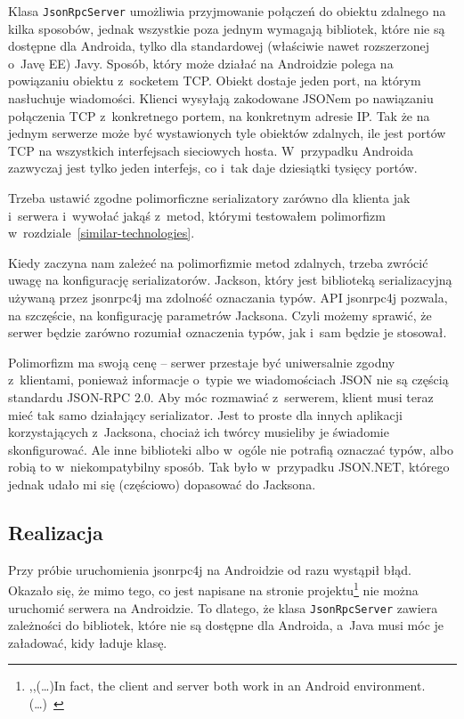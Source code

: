 Klasa \texttt{JsonRpcServer} umożliwia przyjmowanie połączeń do obiektu zdalnego na kilka sposobów, jednak wszystkie poza jednym wymagają bibliotek, które nie są dostępne dla Androida, tylko dla standardowej (właściwie nawet rozszerzonej o~Javę EE) Javy.
Sposób, który może działać na Androidzie polega na powiązaniu obiektu z~socketem TCP. Obiekt dostaje jeden port, na którym nasłuchuje wiadomości.
Klienci wysyłają zakodowane JSONem po nawiązaniu połączenia TCP z~konkretnego portem, na konkretnym adresie IP.
Tak że na jednym serwerze może być wystawionych tyle obiektów zdalnych, ile jest portów TCP na wszystkich interfejsach sieciowych hosta.
W~przypadku Androida zazwyczaj jest tylko jeden interfejs, co i~tak daje dziesiątki tysięcy portów.

Trzeba ustawić zgodne polimorficzne serializatory zarówno dla klienta jak i~serwera i~wywołać jakąś z~metod, którymi testowałem polimorfizm w~rozdziale~\ref{similar-technologies}.

Kiedy zaczyna nam zależeć na polimorfizmie metod zdalnych, trzeba zwrócić uwagę na konfigurację serializatorów.
Jackson, który jest biblioteką serializacyjną używaną przez jsonrpc4j ma zdolność oznaczania typów. API jsonrpc4j pozwala, na szczęście, na konfigurację parametrów Jacksona. Czyli możemy sprawić, że serwer będzie zarówno rozumiał oznaczenia typów, jak i~sam będzie je stosował.

Polimorfizm ma swoją cenę -- serwer przestaje być uniwersalnie zgodny z~klientami, ponieważ informacje o~typie we wiadomościach JSON nie są częścią standardu JSON-RPC 2.0.
Aby móc rozmawiać z~serwerem, klient musi teraz mieć tak samo działający serializator.
Jest to proste dla innych aplikacji korzystających z~Jacksona, chociaż ich twórcy musieliby je świadomie skonfigurować. Ale inne biblioteki albo w~ogóle nie potrafią oznaczać typów, albo robią to w~niekompatybilny sposób.
Tak było w~przypadku JSON.NET, którego jednak udało mi się (częściowo) dopasować do Jacksona. 


\subsection{Realizacja}
Przy próbie uruchomienia jsonrpc4j na Androidzie od razu wystąpił błąd. Okazało się, że mimo tego, co jest napisane na stronie projektu\footnote{,,(\ldots)In fact, the client and server both work in an Android environment.(\ldots)~\cite{jsonrpc4j}} nie można uruchomić serwera na Androidzie.
To dlatego, że klasa \texttt{JsonRpcServer} zawiera zależności do bibliotek, które nie są dostępne dla Androida, a~Java musi móc je załadować, kidy ładuje klasę.


